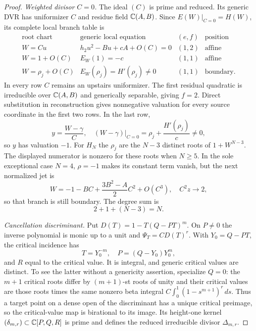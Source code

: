 \begin{proof}
\smallskip
\noindent\emph{Weighted divisor $C=0$.}
The ideal $(C)$ is prime and reduced.  Its generic DVR has uniformizer $C$
and residue field $\mathbb C(A,B)$.  Since $E(W)|_{C=0}=H(W)$, its complete local
branch table is
\[
\begin{array}{c|c|c|c}
 \text{root chart}&\text{generic local equation}&(e,f)&\text{position}\\ \hline
 W=Cu&h_2u^2-Bu+cA+O(C)=0&(1,2)&\text{affine}\\
 W=1+O(C)&E_W(1)=-c&(1,1)&\text{affine}\\
 W=\rho_j+O(C)&E_W(\rho_j)=H'(\rho_j)\ne0&(1,1)&\text{boundary}.
\end{array}                                                \tag{4.5}
\]
In every row $C$ remains an upstairs uniformizer.  The first residual
quadratic is irreducible over $\mathbb C(A,B)$ and generically separable, giving
$f=2$.  Direct substitution in reconstruction gives nonnegative valuation
for every source coordinate in the first two rows.  In the last row,
\[
 y=\frac{W-\gamma}{C},\quad
 (W-\gamma)|_{C=0}=\rho_j+\frac{H'(\rho_j)}{c}\ne0,     \tag{4.6}
\]
so $y$ has valuation $-1$.  For $H_N$ the $\rho_j$ are the $N-3$ distinct
roots of $1+W^{N-3}$.  The displayed numerator is nonzero for these roots
when $N\ge5$.  In the sole exceptional case $N=4$, $\rho=-1$ makes its
constant term vanish, but the next normalized jet is
\[
 W=-1-BC+\frac{3B^2-A}{2}C^2+O(C^3),
 \quad C^2z\longrightarrow2,                            \tag{4.7}
\]
so that branch is still boundary.  The degree sum is
\[
 2+1+(N-3)=N.                                             \tag{4.8}
\]

\smallskip
\noindent\emph{Cancellation discriminant.}
Put $D(T)=1-T(Q-PT)^m$.  On $P\ne0$ the inverse polynomial is monic up to a
unit and $\Psi_T=CD(T)^r$.  With $Y_0=Q-PT$, the critical incidence has
\[
 T=Y_0^{-m},\quad P=(Q-Y_0)Y_0^m,                        \tag{4.9}
\]
and $R$ equal to the critical value.  It is integral, and generic critical
values are distinct.  To see the latter without a genericity assertion,
specialize $Q=0$: the $m+1$ critical roots differ by $(m+1)$-st roots of
unity and their critical values are those roots times the same nonzero beta
integral $C\int_0^1(1-s^{m+1})^r\,ds$.  Thus a target point on a dense open
of the discriminant has a unique critical preimage, so the critical-value
map is birational to its image.  Its height-one
kernel $(\delta_{m,r})\subset\mathbb C[P,Q,R]$ is prime and defines the reduced
irreducible divisor $\Delta_{m,r}$.


\end{proof}

